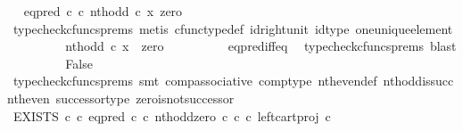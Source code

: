 \begin{isabellebody}
\ \isamarkupfalse%
\ {\isachardoublequoteopen}eq{\isacharunderscore}{\kern0pt}pred\ {\isasymnat}\isactrlsub c\ {\isasymcirc}\isactrlsub c\ {\isasymlangle}nth{\isacharunderscore}{\kern0pt}odd\ {\isasymcirc}\isactrlsub c\ x{\isacharcomma}{\kern0pt}\ zero{\isasymrangle}\ {\isacharequal}{\kern0pt}\ {\isasymt}{\isachardoublequoteclose}\isanewline
\ \ \ \ \ \ \ \ \isamarkupfalse%
\ {\isacharparenleft}{\kern0pt}typecheck{\isacharunderscore}{\kern0pt}cfuncs{\isacharunderscore}{\kern0pt}prems{\isacharcomma}{\kern0pt}\ metis\ cfunc{\isacharunderscore}{\kern0pt}type{\isacharunderscore}{\kern0pt}def\ id{\isacharunderscore}{\kern0pt}right{\isacharunderscore}{\kern0pt}unit\ id{\isacharunderscore}{\kern0pt}type\ one{\isacharunderscore}{\kern0pt}unique{\isacharunderscore}{\kern0pt}element{\isacharparenright}{\kern0pt}\isanewline
\ \ \ \ \ \ \isamarkupfalse%
\ \isamarkupfalse%
\ {\isachardoublequoteopen}nth{\isacharunderscore}{\kern0pt}odd\ {\isasymcirc}\isactrlsub c\ x\ {\isacharequal}{\kern0pt}\ zero{\isachardoublequoteclose}\isanewline
\ \ \ \ \ \ \ \ \isamarkupfalse%
\ eq{\isacharunderscore}{\kern0pt}pred{\isacharunderscore}{\kern0pt}iff{\isacharunderscore}{\kern0pt}eq\ \isamarkupfalse%
\ {\isacharparenleft}{\kern0pt}typecheck{\isacharunderscore}{\kern0pt}cfuncs{\isacharunderscore}{\kern0pt}prems{\isacharcomma}{\kern0pt}\ blast{\isacharparenright}{\kern0pt}\isanewline
\ \ \ \ \ \ \isamarkupfalse%
\ \isamarkupfalse%
\ False\isanewline
\ \ \ \ \ \ \ \ \isamarkupfalse%
\ {\isacharparenleft}{\kern0pt}typecheck{\isacharunderscore}{\kern0pt}cfuncs{\isacharunderscore}{\kern0pt}prems{\isacharcomma}{\kern0pt}\ smt\ comp{\isacharunderscore}{\kern0pt}associative{}\ comp{\isacharunderscore}{\kern0pt}type\ nth{\isacharunderscore}{\kern0pt}even{\isacharunderscore}{\kern0pt}def{}\ nth{\isacharunderscore}{\kern0pt}odd{\isacharunderscore}{\kern0pt}is{\isacharunderscore}{\kern0pt}succ{\isacharunderscore}{\kern0pt}nth{\isacharunderscore}{\kern0pt}even\ successor{\isacharunderscore}{\kern0pt}type\ zero{\isacharunderscore}{\kern0pt}is{\isacharunderscore}{\kern0pt}not{\isacharunderscore}{\kern0pt}successor{\isacharparenright}{\kern0pt}\isanewline
\ \ \ \ \isamarkupfalse%
\isanewline
\ \ \ \ \isamarkupfalse%
\ \isamarkupfalse%
\ {\isachardoublequoteopen}EXISTS\ {\isasymnat}\isactrlsub c\ {\isasymcirc}\isactrlsub c\ {\isacharparenleft}{\kern0pt}{\isacharparenleft}{\kern0pt}eq{\isacharunderscore}{\kern0pt}pred\ {\isasymnat}\isactrlsub c\ {\isasymcirc}\isactrlsub c\ {\isasymlangle}nth{\isacharunderscore}{\kern0pt}odd{\isacharcomma}{\kern0pt}zero\ {\isasymcirc}\isactrlsub c\ {\isasymbeta}\isactrlbsub {\isasymnat}\isactrlsub c\isactrlesub {\isasymrangle}{\isacharparenright}{\kern0pt}\ {\isasymcirc}\isactrlsub c\ left{\isacharunderscore}{\kern0pt}cart{\isacharunderscore}{\kern0pt}proj\ {\isasymnat}\isactrlsub c\ {\isasymone}{\isacharparenright}{\kern0pt}\isactrlsup {\isasymsharp}\ {\isasymnoteq}\ {\isasymt}{\isachardoublequoteclose}\isanewline

\end{isabellebody}
